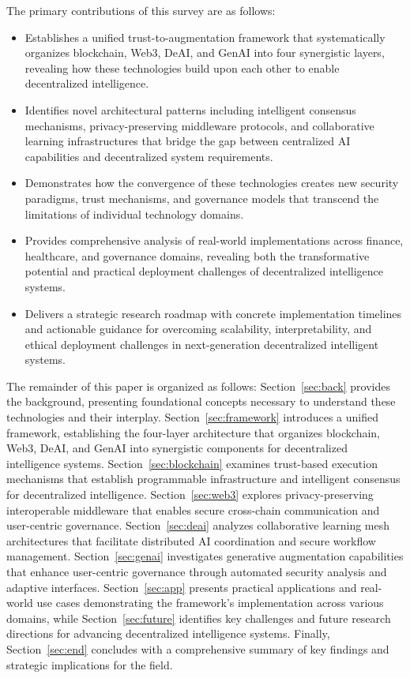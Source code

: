 \documentclass[5p,twocolumn]{elsarticle}
\begin{document}
The primary contributions of this survey are as follows:
\begin{itemize}

\item Establishes a unified trust-to-augmentation framework that systematically organizes blockchain, Web3, DeAI, and GenAI into four synergistic layers, revealing how these technologies build upon each other to enable decentralized intelligence.
  
\item Identifies novel architectural patterns including intelligent consensus mechanisms, privacy-preserving middleware protocols, and collaborative learning infrastructures that bridge the gap between centralized AI capabilities and decentralized system requirements.
  
\item Demonstrates how the convergence of these technologies creates new security paradigms, trust mechanisms, and governance models that transcend the limitations of individual technology domains.
  
\item Provides comprehensive analysis of real-world implementations across finance, healthcare, and governance domains, revealing both the transformative potential and practical deployment challenges of decentralized intelligence systems.
  
\item Delivers a strategic research roadmap with concrete implementation timelines and actionable guidance for overcoming scalability, interpretability, and ethical deployment challenges in next-generation decentralized intelligent systems.

\end{itemize}

The remainder of this paper is organized as follows: Section~\ref{sec:back} provides the background, presenting foundational concepts necessary to understand these technologies and their interplay. Section~\ref{sec:framework} introduces a unified framework, establishing the four-layer architecture that organizes blockchain, Web3, DeAI, and GenAI into synergistic components for decentralized intelligence systems. Section~\ref{sec:blockchain} examines trust-based execution mechanisms that establish programmable infrastructure and intelligent consensus for decentralized intelligence. Section~\ref{sec:web3} explores privacy-preserving interoperable middleware that enables secure cross-chain communication and user-centric governance. Section~\ref{sec:deai} analyzes collaborative learning mesh architectures that facilitate distributed AI coordination and secure workflow management. Section~\ref{sec:genai} investigates generative augmentation capabilities that enhance user-centric governance through automated security analysis and adaptive interfaces. Section~\ref{sec:app} presents practical applications and real-world use cases demonstrating the framework's implementation across various domains, while Section~\ref{sec:future} identifies key challenges and future research directions for advancing decentralized intelligence systems. Finally, Section~\ref{sec:end} concludes with a comprehensive summary of key findings and strategic implications for the field.
\end{document}
